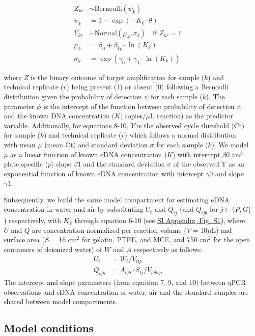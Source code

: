 \documentclass{article}
\begin{document}
\begin{align}
    Z_{kr} &\sim \mathrm{Bernoulli} \left(\psi_{k}\right)  \\
    \psi_{k} &= 1 - \exp(-K_{k} \cdot \theta) \\
    Y_{kr} &\sim \mathrm{Normal} (\mu_{k}, \sigma_{k}) \quad \text{if } Z_{kr} = 1 \\
    \mu_{k} &= \beta_0 + \beta_{1p} \cdot \ln (K_{k}) \\
    \sigma_{k} &= \exp(\gamma_0 + \gamma_1 \cdot \ln (K_{k}))
\end{align}

where $Z$ is the binary outcome of target amplification for sample ($k$) and technical replicate ($r$) being present (1) or absent (0) following a Bernoulli distribution given the probability of detection $\psi$ for each sample ($k$). The parameter $\phi$ is the intercept of the function between probability of detection $\psi$ and the known DNA concentration ($K$; copies/$\mu$L reaction) as the predictor variable. Additionally, for equations 8-10, $Y$ is the observed cycle threshold (Ct) for sample ($k$) and technical replicate ($r$) which follows a normal distribution with mean $\mu$ (mean Ct) and standard deviation $\sigma$ for each sample ($k$). We model $\mu$ as a linear function of known eDNA concentration ($K$) with intercept $\beta0$ and plate specific ($p$) slope $\beta1$ and the standard deviation $\sigma$ of the observed Y as an exponential function of known eDNA concentration with intercept $\gamma0$ and slope $\gamma1$.

Subsequently, we build the same model compartment for estimating eDNA concentration in water and air by substituting $U_t$ and $Q_{tj}$ (and $Q_{tjb}$ for $j \in \{P,G\}$) respectively, with $K_k$ through equation 6-10 (see \href{SI_Appendix.pdf}{SI Appendix, Fig. S1}), where $U$ and $Q$ are concentration normalized per reaction volume ($V$ = 10$\mu$L) and surface area ($S$ = 16 cm$^2$ for gelatin, PTFE, and MCE, and 750 cm$^2$ for the open containers of deionized water) of $W$ and $A$ respectively as follows:
\begin{align}
    U_t & = W_t / V_{itp}\\
    Q_{tjb} & = A_{tjb} \cdot S_{tj} / V_{tjbrp}
\end{align}
The intercept and slope parameters (from equation 7, 9, and 10) between qPCR observations and eDNA concentration of water, air and the standard samples are shared between model compartments.


\subsection{Model conditions}
\end{document}
